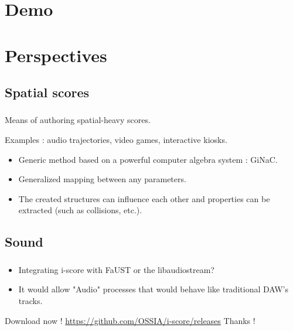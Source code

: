 \documentclass[12pt,t]{beamer}
\makeatletter
\newcommand*{\currentname}{\@currentlabelname}
\makeatother
\begin{document}
\section{Demo}


\section{Perspectives}
\subsection{Spatial scores}
\begin{frame}
    \frametitle{\currentname}
    Means of authoring spatial-heavy scores.
    
    Examples : audio trajectories, video games, interactive kiosks.
    
    \begin{itemize}
        \item Generic method based on a powerful computer algebra system : GiNaC.
        \item Generalized mapping between any parameters. 
        \item The created structures can influence each other and properties can be 
        extracted (such as collisions, etc.).
    \end{itemize}
\end{frame}

\subsection{Sound}
\begin{frame}
    \frametitle{\currentname}
    \begin{itemize}
        \item Integrating i-score with FaUST or the libaudiostream?
        \item It would allow "Audio" processes that would behave like traditional DAW's tracks.
    \end{itemize}
\end{frame}

\begin{frame}
    Download now !
    \url{https://github.com/OSSIA/i-score/releases}
    Thanks !
\end{frame}
\end{document}
